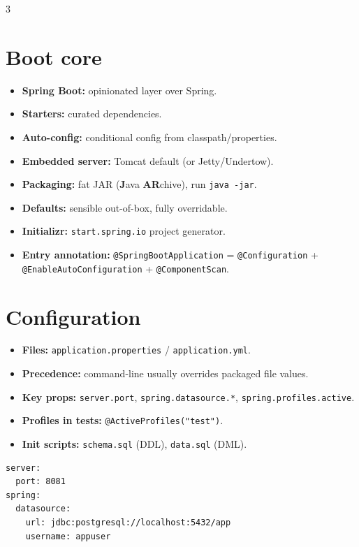 \begin{multicols}{3}
\raggedright
\small

\section*{Boot core}
\begin{itemize}[leftmargin=*, nosep, topsep=0pt]
  \item \textbf{Spring Boot:} opinionated layer over Spring.
  \item \textbf{Starters:} curated dependencies.
  \item \textbf{Auto-config:} conditional config from classpath/properties.
  \item \textbf{Embedded server:} Tomcat default (or Jetty/Undertow).
  \item \textbf{Packaging:} fat JAR (\textbf{J}ava \textbf{AR}chive), run \texttt{java -jar}.
  \item \textbf{Defaults:} sensible out-of-box, fully overridable.
  \item \textbf{Initializr:} \texttt{start.spring.io} project generator.
  \item \textbf{Entry annotation:} \texttt{@SpringBootApplication} = \texttt{@Configuration} + \texttt{@EnableAutoConfiguration} + \texttt{@ComponentScan}.
\end{itemize}

\section*{Configuration}
\begin{itemize}[leftmargin=*, nosep, topsep=0pt]
  \item \textbf{Files:} \texttt{application.properties} / \texttt{application.yml}.
  \item \textbf{Precedence:} command-line usually overrides packaged file values.
  \item \textbf{Key props:} \texttt{server.port}, \texttt{spring.datasource.*}, \texttt{spring.profiles.active}.
  \item \textbf{Profiles in tests:} \texttt{@ActiveProfiles("test")}.
  \item \textbf{Init scripts:} \texttt{schema.sql} (DDL), \texttt{data.sql} (DML).
\end{itemize}

\begin{lstlisting}[aboveskip=2pt,belowskip=2pt]
server:
  port: 8081
spring:
  datasource:
    url: jdbc:postgresql://localhost:5432/app
    username: appuser
\end{lstlisting}




\end{multicols}
